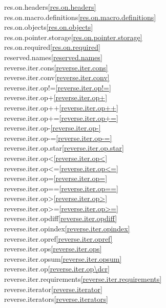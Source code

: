\begin{multicols}{2}
res.on.headers\quad\ref{res.on.headers}\\
res.on.macro.definitions\quad\ref{res.on.macro.definitions}\\
res.on.objects\quad\ref{res.on.objects}\\
res.on.pointer.storage\quad\ref{res.on.pointer.storage}\\
res.on.required\quad\ref{res.on.required}\\
reserved.names\quad\ref{reserved.names}\\
reverse.iter.cons\quad\ref{reverse.iter.cons}\\
reverse.iter.conv\quad\ref{reverse.iter.conv}\\
reverse.iter.op!=\quad\ref{reverse.iter.op!=}\\
reverse.iter.op+\quad\ref{reverse.iter.op+}\\
reverse.iter.op++\quad\ref{reverse.iter.op++}\\
reverse.iter.op+=\quad\ref{reverse.iter.op+=}\\
reverse.iter.op-\quad\ref{reverse.iter.op-}\\
reverse.iter.op-=\quad\ref{reverse.iter.op-=}\\
reverse.iter.op.star\quad\ref{reverse.iter.op.star}\\
reverse.iter.op<\quad\ref{reverse.iter.op<}\\
reverse.iter.op<=\quad\ref{reverse.iter.op<=}\\
reverse.iter.op=\quad\ref{reverse.iter.op=}\\
reverse.iter.op==\quad\ref{reverse.iter.op==}\\
reverse.iter.op>\quad\ref{reverse.iter.op>}\\
reverse.iter.op>=\quad\ref{reverse.iter.op>=}\\
reverse.iter.opdiff\quad\ref{reverse.iter.opdiff}\\
reverse.iter.opindex\quad\ref{reverse.iter.opindex}\\
reverse.iter.opref\quad\ref{reverse.iter.opref}\\
reverse.iter.ops\quad\ref{reverse.iter.ops}\\
reverse.iter.opsum\quad\ref{reverse.iter.opsum}\\
reverse.iter.op\dcr\quad\ref{reverse.iter.op\dcr}\\
reverse.iter.requirements\quad\ref{reverse.iter.requirements}\\
reverse.iterator\quad\ref{reverse.iterator}\\
reverse.iterators\quad\ref{reverse.iterators}\\

\end{multicols}
